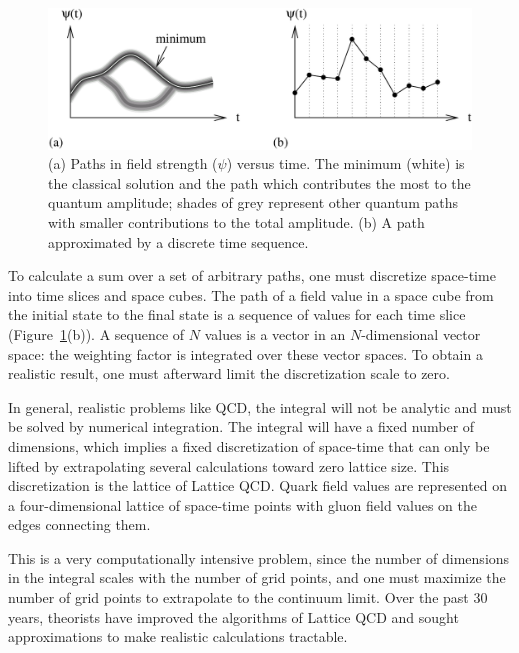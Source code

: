 \documentclass{cornell}
\begin{document}
\begin{figure}[p]
  \begin{center}
    \includegraphics[width=\linewidth]{plots/pathintegrals}
  \end{center}
  \caption{\label{pathintegrals} (a) Paths in field strength ($\psi$)
  versus time.  The minimum (white) is the classical solution and the
  path which contributes the most to the quantum amplitude; shades of
  grey represent other quantum paths with smaller contributions to the
  total amplitude.  (b) A path approximated by a discrete time
  sequence.}
\end{figure}

To calculate a sum over a set of arbitrary paths, one must discretize
space-time into time slices and space cubes.  The path of a field
value in a space cube from the initial state to the final state is a
sequence of values for each time slice (Figure~\ref{pathintegrals}(b)).
A sequence of $N$ values is a vector in an $N$-dimensional vector
space: the weighting factor is integrated over these vector spaces.
To obtain a realistic result, one must afterward limit the
discretization scale to zero.

In general, realistic problems like QCD, the integral will not be
analytic and must be solved by numerical integration.  The integral
will have a fixed number of dimensions, which implies a fixed
discretization of space-time that can only be lifted by extrapolating
several calculations toward zero lattice size.  This discretization is
the lattice of Lattice QCD.  Quark field values are represented on a
four-dimensional lattice of space-time points with gluon field values
on the edges connecting them.

This is a very computationally intensive problem, since the number of
dimensions in the integral scales with the number of grid points, and
one must maximize the number of grid points to extrapolate to the
continuum limit.  Over the past 30 years, theorists have improved the
algorithms of Lattice QCD and sought approximations to make realistic
calculations tractable.
\end{document}
